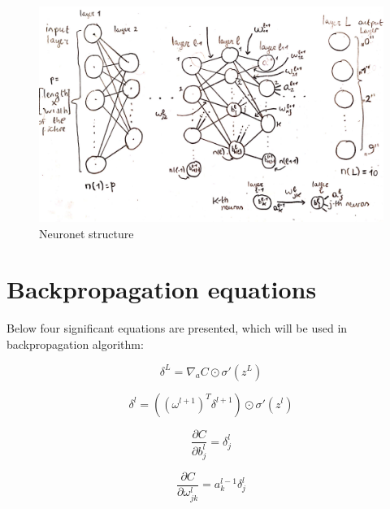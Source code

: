 \documentclass[a4paper,12pt]{article}
\theoremstyle{plain} %
\theoremstyle{definition} %
\theoremstyle{remark} %
\begin{document}
\begin{figure}[h!]
	\begin{center}
		\includegraphics[scale = 0.75]{1.png}
		\caption{Neuronet structure}
		\label{p1}
	\end{center}
\end{figure}
\section{Backpropagation equations}

Below four significant equations are presented, which will be used in backpropagation algorithm:

\begin{equation}\label{eq:1}
{\delta ^L} = {\nabla _a}C \odot \sigma '({z^L})
\end{equation}


\begin{equation}\label{eq:2}
{\delta ^l} = \left( {{{\left( {{\omega ^{l + 1}}} \right)}^T}{\delta ^{l + 1}}} \right) \odot \sigma '({z^l})
\end{equation}


\begin{equation}\label{eq:3}
\frac{{\partial C}}{{\partial b_j^l}} = \delta _j^l
\end{equation}


\begin{equation}\label{eq:4}
\frac{{\partial C}}{{\partial \omega _{jk}^l}} = a_k^{l - 1}\delta _j^l
\end{equation}
\newpage
\end{document}
